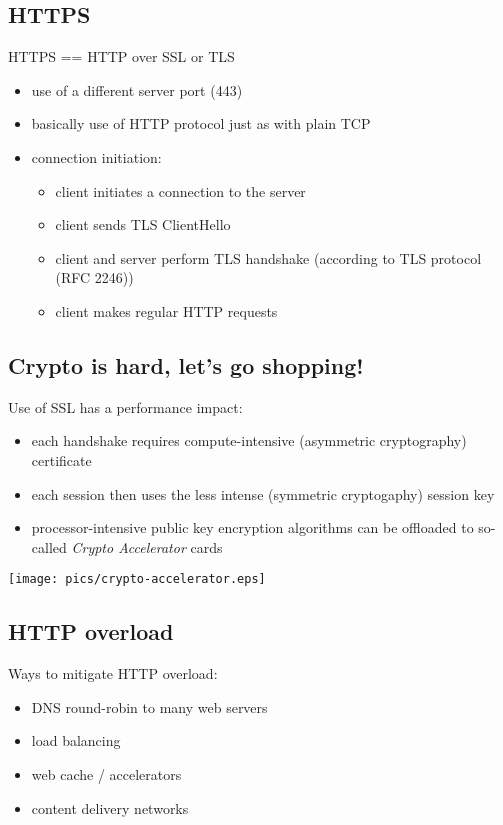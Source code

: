 \documentclass[xga]{xdvislides}
\begin{document}
\subsection{HTTPS}
HTTPS == HTTP over SSL or TLS
\begin{itemize}
	\item use of a different server port (443)
	\item basically use of HTTP protocol just as with plain TCP
	\item connection initiation:
		\begin{itemize}
			\item client initiates a connection to the server
			\item client sends TLS ClientHello
			\item client and server perform TLS handshake (according to TLS
				protocol (RFC 2246))
			\item client makes regular HTTP requests
		\end{itemize}
\end{itemize}

\subsection{Crypto is hard, let's go shopping!}
Use of SSL has a performance impact:
\begin{itemize}
	\item each handshake requires compute-intensive (asymmetric
		cryptography) certificate
	\item each session then uses the less intense (symmetric
		cryptogaphy) session key
	\item processor-intensive public key encryption algorithms can be
		offloaded to so-called {\em Crypto Accelerator} cards
\end{itemize}
\begin{center}
	\texttt{[image: pics/crypto-accelerator.eps]}
\end{center}

\subsection{HTTP overload}
Ways to mitigate HTTP overload:

\begin{itemize}
	\item DNS round-robin to many web servers
	\item load balancing
	\item web cache / accelerators
	\item content delivery networks
\end{itemize}
\end{document}
